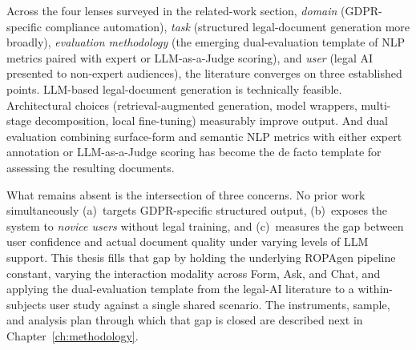 Across the four lenses surveyed in the related-work section, \emph{domain} (GDPR-specific compliance automation), \emph{task} (structured legal-document generation more broadly), \emph{evaluation methodology} (the emerging dual-evaluation template of NLP metrics paired with expert or LLM-as-a-Judge scoring), and \emph{user} (legal AI presented to non-expert audiences), the literature converges on three established points. LLM-based legal-document generation is technically feasible. Architectural choices (retrieval-augmented generation, model wrappers, multi-stage decomposition, local fine-tuning) measurably improve output. And dual evaluation combining surface-form and semantic NLP metrics with either expert annotation or LLM-as-a-Judge scoring has become the de facto template for assessing the resulting documents.

What remains absent is the intersection of three concerns. No prior work simultaneously (a)~targets GDPR-specific structured output, (b)~exposes the system to \emph{novice users} without legal training, and (c)~measures the gap between user confidence and actual document quality under varying levels of LLM support. This thesis fills that gap by holding the underlying ROPAgen pipeline constant, varying the interaction modality across Form, Ask, and Chat, and applying the dual-evaluation template from the legal-AI literature to a within-subjects user study against a single shared scenario. The instruments, sample, and analysis plan through which that gap is closed are described next in Chapter~\ref{ch:methodology}.
